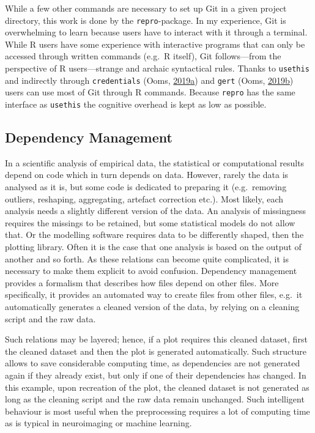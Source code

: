 \documentclass[12pt,a4paper,twoside]{article}
\begin{document}
While a few other commands are necessary to set up Git in a given project directory, this work is done by the \texttt{repro}-package.
In my experience, Git is overwhelming to learn because users have to interact with it through a terminal.
While R users have some experience with interactive programs that can only be accessed through written commands (e.g.~R itself), Git follows---from the perspective of R users---strange and archaic syntactical rules.
Thanks to \texttt{usethis} and indirectly through \texttt{credentials} (Ooms, \protect\hyperlink{ref-R-credentials}{2019}\protect\hyperlink{ref-R-credentials}{a}) and \texttt{gert} (Ooms, \protect\hyperlink{ref-R-gert}{2019}\protect\hyperlink{ref-R-gert}{b}) users can use most of Git through R commands.
Because \texttt{repro} has the same interface as \texttt{usethis} the cognitive overhead is kept as low as possible.

\hypertarget{dependency-management}{%
\subsection{Dependency Management}\label{dependency-management}}

In a scientific analysis of empirical data, the statistical or computational results depend on code which in turn depends on data.
However, rarely the data is analysed as it is, but some code is dedicated to preparing it (e.g.~removing outliers, reshaping, aggregating, artefact correction etc.).
Most likely, each analysis needs a slightly different version of the data.
An analysis of missingness requires the missings to be retained, but some statistical models do not allow that.
Or the modelling software requires data to be differently shaped, then the plotting library.
Often it is the case that one analysis is based on the output of another and so forth.
As these relations can become quite complicated, it is necessary to make them explicit to avoid confusion.
Dependency management provides a formalism that describes how files depend on other files.
More specifically, it provides an automated way to create files from other files, e.g.~it automatically generates a cleaned version of the data, by relying on a cleaning script and the raw data.

Such relations may be layered; hence, if a plot requires this cleaned dataset, first the cleaned dataset and then the plot is generated automatically.
Such structure allows to save considerable computing time, as dependencies are not generated again if they already exist, but only if one of their dependencies has changed.
In this example, upon recreation of the plot, the cleaned dataset is not generated as long as the cleaning script and the raw data remain unchanged.
Such intelligent behaviour is most useful when the preprocessing requires a lot of computing time as is typical in neuroimaging or machine learning.
\end{document}

